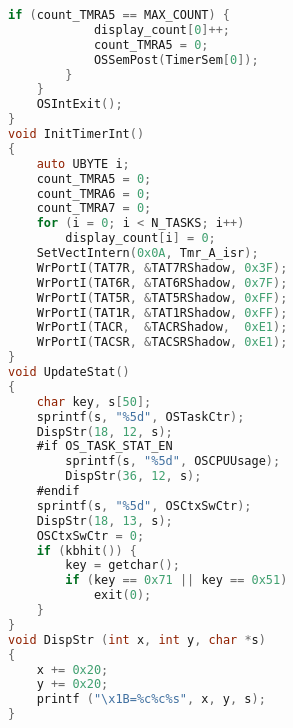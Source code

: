 \begin{lstlisting}[language=C]
        if (count_TMRA5 == MAX_COUNT) {
            display_count[0]++;
            count_TMRA5 = 0;
            OSSemPost(TimerSem[0]);
        }
    }
    OSIntExit();
}
void InitTimerInt()
{
    auto UBYTE i;
    count_TMRA5 = 0;
    count_TMRA6 = 0;
    count_TMRA7 = 0;
    for (i = 0; i < N_TASKS; i++)
        display_count[i] = 0;
    SetVectIntern(0x0A, Tmr_A_isr);
    WrPortI(TAT7R, &TAT7RShadow, 0x3F);
    WrPortI(TAT6R, &TAT6RShadow, 0x7F);
    WrPortI(TAT5R, &TAT5RShadow, 0xFF);
    WrPortI(TAT1R, &TAT1RShadow, 0xFF);
    WrPortI(TACR,  &TACRShadow,  0xE1);
    WrPortI(TACSR, &TACSRShadow, 0xE1);
}
void UpdateStat()
{
    char key, s[50];
    sprintf(s, "%5d", OSTaskCtr);
    DispStr(18, 12, s);
    #if OS_TASK_STAT_EN
        sprintf(s, "%5d", OSCPUUsage);
        DispStr(36, 12, s);
    #endif
    sprintf(s, "%5d", OSCtxSwCtr);
    DispStr(18, 13, s);
    OSCtxSwCtr = 0;
    if (kbhit()) {
        key = getchar();
        if (key == 0x71 || key == 0x51)
            exit(0);
    }
}
void DispStr (int x, int y, char *s)
{
    x += 0x20;
    y += 0x20;
    printf ("\x1B=%c%c%s", x, y, s);
}
\end{lstlisting}